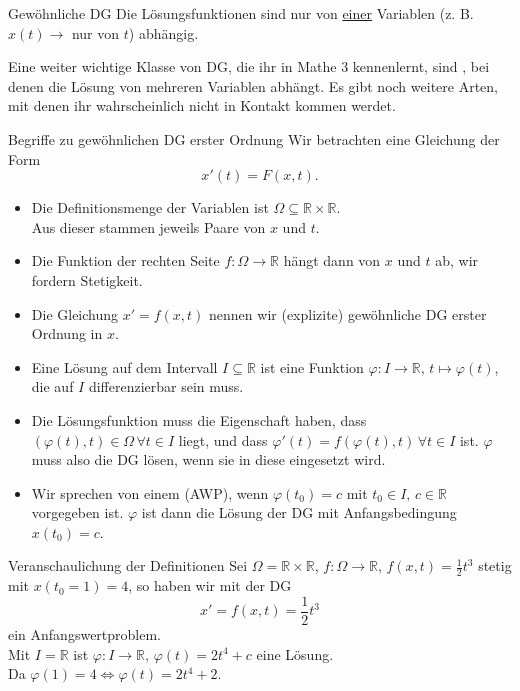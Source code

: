 \begin{Def}
{Gewöhnliche DG}
Die Lösungsfunktionen  sind nur von \underline{einer} Variablen (z. B. $x(t)\to$ nur von $t$) abhängig.
\end{Def}
Eine weiter wichtige Klasse von DG, die ihr in Mathe 3 kennenlernt, sind , bei denen die Lösung von mehreren Variablen abhängt. Es gibt noch weitere Arten, mit denen ihr wahrscheinlich nicht in Kontakt kommen werdet.\\
\begin{Def}
{Begriffe zu gewöhnlichen DG erster Ordnung}
Wir betrachten eine Gleichung der Form
\begin{equation*}
    x'(t)=F(x,t).
\end{equation*}
\begin{itemize}
    \item Die Definitionsmenge der Variablen ist $\Omega\subseteq\mathbb{R}\times\mathbb{R}$.\\
    Aus dieser stammen jeweils Paare von $x$ und $t$.
    \item Die Funktion der rechten Seite $f:\Omega\to \mathbb{R}$ hängt dann von $x$ und $t$ ab, wir fordern Stetigkeit.
    \item Die Gleichung $x'=f(x,t)$ nennen wir (explizite) gewöhnliche DG erster Ordnung in $x$.
    \item Eine Lösung auf dem Intervall $I\subseteq\mathbb{R}$ ist eine Funktion $\varphi:I\to\mathbb{R},\,t\mapsto\varphi(t)$, die auf $I$ differenzierbar sein muss.
    \item Die Lösungsfunktion muss die Eigenschaft haben, dass $(\varphi(t),t)\in\Omega\,\forall t\in I$ liegt, und dass $\varphi'(t)=f(\varphi(t),t)\,\forall t\in I$ ist. $\varphi$ muss also die DG lösen, wenn sie in diese eingesetzt wird.
    \item Wir sprechen von einem  (AWP), wenn $\varphi(t_0)=c$ mit $t_0\in I,\,c\in\mathbb{R}$ vorgegeben ist. $\varphi$ ist dann die Lösung der DG mit Anfangsbedingung $x(t_0)=c$.
\end{itemize}
\end{Def}
\begin{Beispiel}
{Veranschaulichung der Definitionen}
Sei $\Omega=\mathbb{R}\times\mathbb{R}$, $f:\Omega\to\mathbb{R},\,f(x,t)=\frac{1}{2}t^3$ stetig mit $x(t_0=1)=4$, so haben wir mit der DG
\begin{equation*}
    x'=f(x,t)=\frac{1}{2}t^3
\end{equation*}
ein Anfangswertproblem.\\
Mit $I=\mathbb{R}$ ist $\varphi:I\to\mathbb{R},\,\varphi(t)=2t^4+c$ eine Lösung.\\
Da $\varphi(1)=4\iff \varphi(t)=2t^4+2$.
\end{Beispiel}
